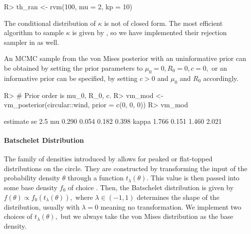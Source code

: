 \begin{CodeChunk}

\begin{CodeInput}
R> th_ran <- rvm(100, mu = 2, kp = 10)
\end{CodeInput}
\end{CodeChunk}

The conditional distribution of \(\kappa\) is not of closed form. The
most efficient algorithm to sample \(\kappa\) is given by
\citet{forbes2015fast}, so we have implemented their rejection sampler
in  as well.

An MCMC sample from the von Mises posterior with an uninformative prior
can be obtained by setting the prior parameters to
\(\mu_0 = 0, R_0 = 0, c = 0,\) or an informative prior can be specified,
by setting \(c > 0\) and \(\mu_0\) and \(R_0\) accordingly.

\begin{CodeChunk}

\begin{CodeInput}
R> # Prior order is mu_0, R_0, c.
R> vm_mod <- vm_posterior(circular::wind, prior = c(0, 0, 0))
R> vm_mod
\end{CodeInput}

\begin{CodeOutput}
      estimate    se  2.5%
mu       0.290 0.054 0.182 0.398
kappa    1.766 0.151 1.460 2.021
\end{CodeOutput}
\end{CodeChunk}

\hypertarget{batschelet-distribution}{%
\paragraph{Batschelet Distribution}\label{batschelet-distribution}}

The family of densities introduced by \citet{batschelet1981circular}
allows for peaked or flat-topped distributions on the circle. They are
constructed by transforming the input of the probability density
\(\theta\) through a function \(t_{\lambda}(\theta).\) This value is
then passed into some base density \(f_0\) of choice
\citep{abe2010symmetric, pewsey2011extension}. Then, the Batschelet
distribution is given by \(f(\theta) \propto f_0(t_\lambda(\theta)),\)
where \(\lambda \in (-1, 1)\) determines the shape of the distribution,
usually with \(\lambda = 0\) meaning no transformation. We implement two
choices of \(t_{\lambda}(\theta),\) but we always take the von Mises
distribution as the base density.


